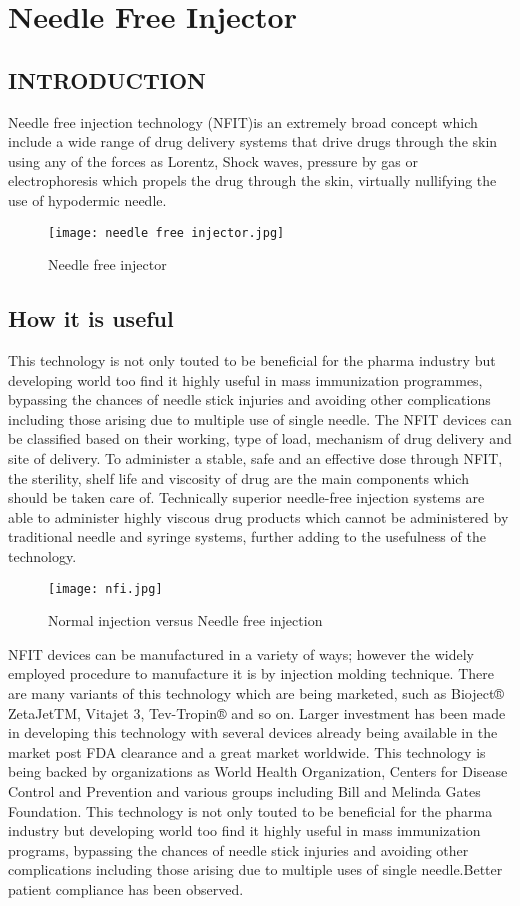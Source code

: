 \documentclass[11pt]{article}
\begin{document}
\section{\Huge Needle Free Injector}
\Large \subsection{INTRODUCTION}
\Large \raggedright Needle free injection technology (NFIT)is an extremely broad concept which include a wide range of drug delivery systems that drive drugs through the skin using any of the forces as Lorentz, Shock waves, pressure by gas or electrophoresis which propels the drug through the skin, virtually nullifying the use of hypodermic needle.

\begin{figure}[h]
\centering
\texttt{[image:  needle free injector.jpg]}
\caption{Needle free injector}
\end{figure}
\subsection{How it is useful}
 \raggedright This technology is not only touted to be beneficial for the pharma industry but developing world too find it highly useful in mass immunization programmes, bypassing the chances of needle stick injuries and avoiding other complications including those arising due to multiple use of single needle. The NFIT devices can be classified based on their working, type of load, mechanism of drug delivery and site of delivery. To administer a stable, safe and an effective dose through NFIT, the sterility, shelf life and viscosity of drug are the main components which should be taken care of. Technically superior needle-free injection systems are able to administer highly viscous drug products which cannot be administered by traditional needle and syringe systems, further adding to the usefulness of the technology.
 
\begin{figure}[h]
\centering
\texttt{[image:  nfi.jpg]}
\caption{Normal injection versus Needle free injection}
\end{figure}
\raggedright
NFIT devices can be manufactured in a variety of ways; however the widely employed procedure to manufacture it is by injection molding technique. There are many variants of this technology which are being marketed, such as Bioject® ZetaJetTM, Vitajet 3, Tev-Tropin® and so on. Larger investment has been made in developing this technology with several devices already being available in the market post FDA clearance and a great market worldwide.
This technology is being backed by organizations as World Health Organization, Centers for Disease Control and Prevention and various groups including Bill and Melinda Gates Foundation. This technology is not only touted to be beneficial for the pharma industry but developing world too find it highly useful in mass immunization programs, bypassing the chances of needle stick injuries and avoiding other complications including those arising due to multiple uses of single needle.Better patient compliance has been observed.
\end{document}
